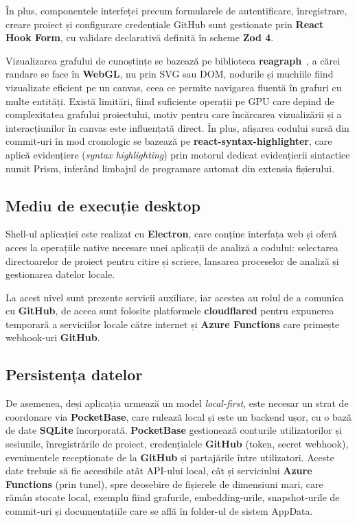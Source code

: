 \documentclass[12pt]{article}
\numberwithin{equation}{section}
\numberwithin{figure}{section}
\numberwithin{table}{section}
\theoremstyle{definition}
\theoremstyle{plain}
\begin{document}
În plus, componentele interfeței precum formularele de autentificare, înregistrare, creare proiect și configurare credențiale GitHub sunt gestionate prin \textbf{React Hook Form}, cu validare declarativă definită în scheme \textbf{Zod 4}.

Vizualizarea grafului de cunoștințe se bazează pe biblioteca \textbf{reagraph}~\cite{reagraph2026}, a cărei randare se face în \textbf{WebGL}, nu prin SVG sau DOM, nodurile și muchiile fiind vizualizate eficient pe un canvas, ceea ce permite navigarea fluentă în grafuri cu multe entități. Există limitări, fiind suficiente operații pe GPU care depind de complexitatea grafului proiectului, motiv pentru care încărcarea vizualizării și a interacțiunilor în canvas este influențată direct. În plus, afișarea codului sursă din commit-uri în mod cronologic se bazează pe \textbf{react-syntax-highlighter}, care aplică evidențiere (\textit{syntax highlighting}) prin motorul dedicat evidențierii sintactice numit Prism, inferând limbajul de programare automat din extensia fișierului.

\subsection{Mediu de execuție desktop}

Shell-ul aplicației este realizat cu \textbf{Electron}, care conține interfața web și oferă acces la operațiile native necesare unei aplicații de analiză a codului: selectarea directoarelor de proiect pentru citire și scriere, lansarea proceselor de analiză și gestionarea datelor locale.

La acest nivel sunt prezente servicii auxiliare, iar acestea au rolul de a comunica cu \textbf{GitHub}, de aceea sunt folosite platformele \textbf{cloudflared} pentru expunerea temporară a serviciilor locale către internet și \textbf{Azure Functions} care primește webhook-uri \textbf{GitHub}.

\subsection{Persistența datelor}

De asemenea, deși aplicația urmează un model \textit{local-first}, este necesar un strat de coordonare via \textbf{PocketBase}, care rulează local și este un backend ușor, cu o bază de date \textbf{SQLite} încorporată. \textbf{PocketBase} gestionează conturile utilizatorilor și sesiunile, înregistrările de proiect, credențialele \textbf{GitHub} (token, secret webhook), evenimentele recepționate de la \textbf{GitHub} și partajările între utilizatori. Aceste date trebuie să fie accesibile atât API-ului local, cât și serviciului \textbf{Azure Functions} (prin tunel), spre deosebire de fișierele de dimensiuni mari, care rămân stocate local, exemplu fiind grafurile, embedding-urile, snapshot-urile de commit-uri și documentațiile care se află în folder-ul de sistem AppData.
\end{document}
